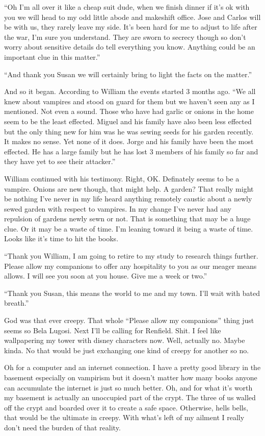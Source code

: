 ``Oh I'm all over it like a cheap suit dude, when we finish dinner if it's ok with you we will head to my odd little abode and makeshift office. Jose and Carlos will be with us, they rarely leave my side. It's been hard for me to adjust to life after the war, I'm sure you understand. They are sworn to secrecy though so don't worry about sensitive details do tell everything you know. Anything could be an important clue in this matter.''

``And thank you Susan we will certainly bring to light the facts on the matter.''

And so it began. According to William the events started 3 months ago. ``We all knew about vampires and stood on guard for them but we haven't seen any as I mentioned. Not even a sound. Those who have had garlic or onions in the home seem to be the least effected. Miguel and his family have also been less effected but the only thing new for him was he was sewing seeds for his garden recently. It makes no sense. Yet none of it does. Jorge and his family have been the most effected. He has a large family but he has lost 3 members of his family so far and they have yet to see their attacker.''

William continued with his testimony. Right, OK. Definately seems to be a vampire. Onions are new though, that might help. A garden? That really might be nothing I've never in my life heard anything remotely caustic about a newly sewed garden with respect to vampires. In my change I've never had any repulsion of gardens newly sewn or not. That is something that may be a huge clue. Or it may be a waste of time. I'm leaning toward it being a waste of time. Looks like it's time to hit the books.

``Thank you William, I am going to retire to my study to research things further. Please allow my companions to offer any hospitality to you as our meager means allows. I will see you soon at you house. Give me a week or two.''

``Thank you Susan, this means the world to me and my town. I'll wait with bated breath.''

God was that ever creepy. That whole ``Please allow my companions'' thing just seems so Bela Lugosi. Next I'll be calling for Renfield. Shit. I feel like wallpapering my tower with disney characters now. Well, actually no. Maybe kinda. No that would be just exchanging one kind of creepy for another so no.

Oh for a computer and an internet connection. I have a pretty good library in the basement especially on vampirism but it doesn't matter how many books anyone can accumulate the internet is just so much better. Oh, and for what it's worth my basement is actually an unoccupied part of the crypt. The three of us walled off the crypt and boarded over it to create a safe space. Otherwise, hells bells, that would be the ultimate in creepy. With what's left of my ailment I really don't need the burden of that reality.

